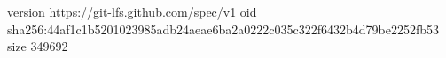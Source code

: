 version https://git-lfs.github.com/spec/v1
oid sha256:44af1c1b5201023985adb24aeae6ba2a0222c035c322f6432b4d79be2252fb53
size 349692
